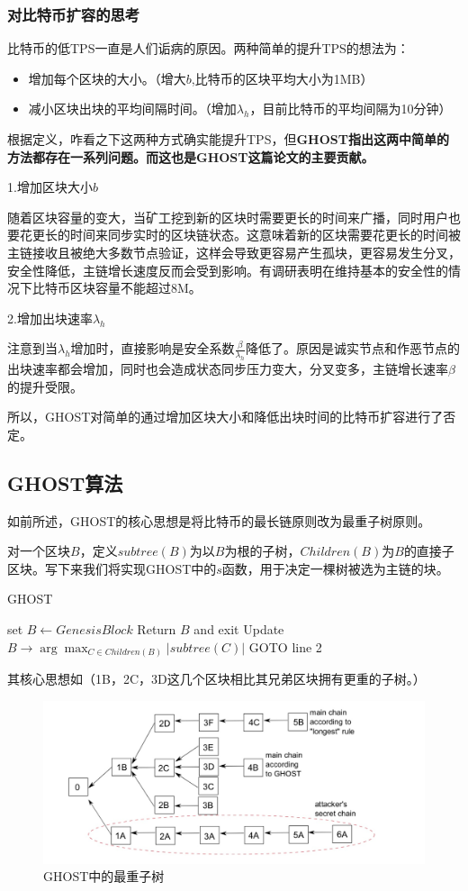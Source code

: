 \subsubsection{对比特币扩容的思考}
比特币的低TPS一直是人们诟病的原因。两种简单的提升TPS的想法为：
\begin{itemize}
	\item 增加每个区块的大小。（增大$b$,比特币的区块平均大小为1MB）
	\item 减小区块出块的平均间隔时间。（增加$\lambda_h$，目前比特币的平均间隔为10分钟）
\end{itemize}
根据定义，咋看之下这两种方式确实能提升TPS，但\textbf{GHOST指出这两中简单的方法都存在一系列问题。而这也是GHOST这篇论文的主要贡献。}

1.增加区块大小$b$

随着区块容量的变大，当矿工挖到新的区块时需要更长的时间来广播，同时用户也要花更长的时间来同步实时的区块链状态。这意味着新的区块需要花更长的时间被主链接收且被绝大多数节点验证，这样会导致更容易产生孤块，更容易发生分叉，安全性降低，主链增长速度反而会受到影响。有调研表明在维持基本的安全性的情况下比特币区块容量不能超过8M。

2.增加出块速率$\lambda_h$

注意到当$\lambda_h$增加时，直接影响是安全系数$\frac{\beta}{\lambda_h}$降低了。原因是诚实节点和作恶节点的出块速率都会增加，同时也会造成状态同步压力变大，分叉变多，主链增长速率$\beta$的提升受限。

所以，GHOST对简单的通过增加区块大小和降低出块时间的比特币扩容进行了否定。

\subsection{GHOST算法}
如前所述，GHOST的核心思想是将比特币的最长链原则改为最重子树原则。

对一个区块$B$，定义$subtree(B)$为以$B$为根的子树，$Children(B)$为$B$的直接子区块。写下来我们将实现GHOST中的$s$函数，用于决定一棵树被选为主链的块。

\begin{algorithm}[H]
	\caption{GHOST}%
   set $B \leftarrow Genesis Block$\;
    {Return $B$ and exit\;}
   {Update $B\rightarrow \arg\max_{C \in Children(B)}|subtree(C)|$\;}
	GOTO line 2\;
\end{algorithm}
其核心思想如（1B，2C，3D这几个区块相比其兄弟区块拥有更重的子树。）
\begin{figure}
	\centering
	\includegraphics[width=1\textwidth]{../common/GHOST_1.png}
	\caption{GHOST中的最重子树} 
	\label{fig:GHOST1}
\end{figure}


